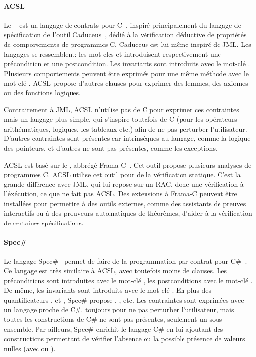 \paragraph{ACSL} Le ~ est
un langage de contrats pour C~, inspiré principalement du langage de
spécification de l'outil Caduceus~, dédié à la vérification
déductive de propriétés de comportements de programmes C. Caduceus est lui-même
inspiré de JML. Les langages se ressemblent: les mot-clés  et
 introduisent respectivement une précondition et une
postcondition. Les invariants sont introduits avec le mot-clé .
Plusieurs comportements peuvent être exprimés pour une même méthode avec le
mot-clé . ACSL propose d'autres clauses pour exprimer des
lemmes, des axiomes ou des fonctions logiques.

Contrairement à JML, ACSL n'utilise pas de C pour exprimer ces contraintes mais
un langage plus simple, qui s'inspire toutefois de C (pour les opérateurs
arithématiques, logiques, les tableaux etc.) afin de ne pas perturber
l'utilisateur. D'autres contraintes sont présentes car intrinsèques au langage,
comme la logique des pointeurs, et d'autres ne sont pas présentes, comme les
exceptions.

ACSL est basé sur le , abbrégé
Frama-C~. Cet outil propose plusieurs analyses de programmes C.
ACSL utilise cet outil pour de la vérification statique. C'est la grande
différence avec JML, qui lui repose sur un RAC, donc une vérification à
l'éxécution, ce que ne fait pas ACSL. Des extensions à Frama-C peuvent être
installées pour permettre à des outils externes, comme des assistants de preuves
interactifs ou à des prouveurs automatiques de théorèmes, d'aider à la
vérification de certaines spécifications.

\paragraph{Spec\#} Le langage Spec\#~ permet de faire de la
programmation par contrat pour C\#~. Ce langage est très similaire
à ACSL, avec toutefois moins de clauses. Les préconditions sont introduites avec
le mot-clé , les postconditions avec le mot-clé .
De même, les invariants sont introduits avec le mot-clé . En
plus des quantificateurs ,  et ,
Spec\# propose , ,  etc. Les contraintes sont
exprimées avec un langage proche de C\#, toujours pour ne pas perturber
l'utilisateur, mais toutes les constructions de C\# ne sont pas présentes,
seulement un sous-ensemble.  Par ailleurs, Spec\# enrichit le langage C\# en lui
ajoutant des constructions permettant de vérifier l'absence ou la possible
présence de valeurs nulles (avec \code{!} ou ).

